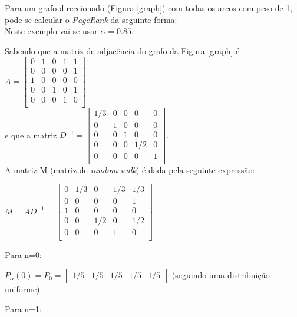 \documentclass[a4paper,10pt]{report}
\begin{document}
  Para um grafo direccionado (Figura \ref{graph}) com todas os arcos com peso de 1, pode-se calcular o \textit{PageRank} da seguinte forma:\\[0.25cm]
 
  Neste exemplo vai-se usar $\alpha=0.85$.
 
  Sabendo que a matriz de adjacência do grafo da Figura \ref{graph} é 
  $A=	\begin{bmatrix}
	  0 & 1 & 0 & 1 & 1 \\
	  0 & 0 & 0 & 0 & 1 \\
	  1 & 0 & 0 & 0 & 0 \\
	  0 & 0 & 1 & 0 & 1 \\
	  0 & 0 & 0 & 1 & 0 \\
	\end{bmatrix}$\\[0.25cm]
   e que a matriz $D^{{-}1}= \begin{bmatrix}
				1/3 & 0 & 0 & 0 & 0 \\
				0 & 1 & 0 & 0 & 0 \\
				0 & 0 & 1 & 0 & 0 \\
				0 & 0 & 0 & 1/2 & 0 \\
				0 & 0 & 0 & 0 & 1 \\
			      \end{bmatrix}$.
  \\[0.25cm]
  A matriz M (matriz de \textit{random walk}) é dada pela seguinte expressão:
  
  $M=AD^{{-}1}= \begin{bmatrix}
		0 & 1/3 & 0   & 1/3 & 1/3 \\
		0 & 0   & 0   & 0   & 1   \\
		1 & 0   & 0   & 0   & 0   \\
		0 & 0   & 1/2 & 0   & 1/2 \\
		0 & 0   & 0   & 1   & 0   \\
	      \end{bmatrix}$
  \\[0.25cm]
  \begin{bf}
    Para n=0:
  \end{bf}
  
  $P_\alpha(0) = P_0 = \begin{bmatrix} 1/5 & 1/5 & 1/5 & 1/5 & 1/5 \end{bmatrix}$ (seguindo uma distribuição uniforme)
  \\[0.25cm]
  \begin{bf}
    Para  n=1:
  \end{bf}
  
\end{document}
